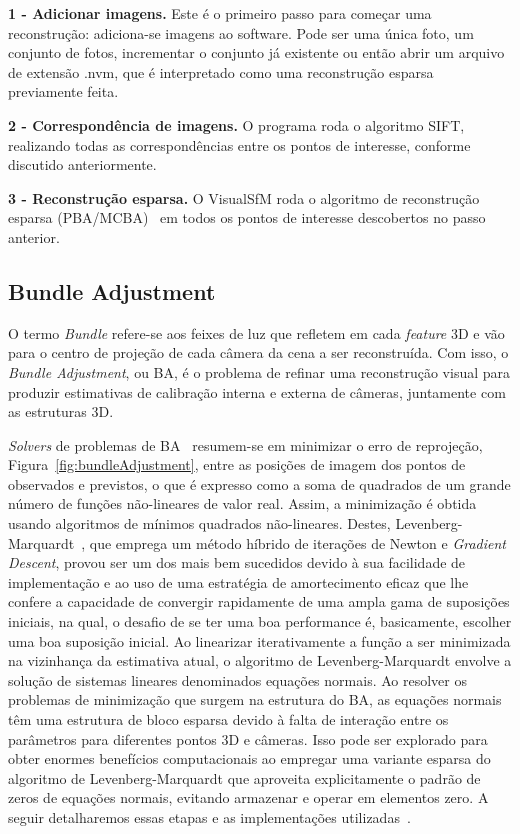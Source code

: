 \noindent \textbf{1 - Adicionar imagens.} Este é o primeiro passo para
  começar uma reconstrução: adiciona-se imagens ao software. Pode ser
  uma única foto, um conjunto de fotos, incrementar o conjunto já existente ou
  então abrir um arquivo de extensão .nvm, que é interpretado como uma
  reconstrução esparsa previamente feita.

\noindent \textbf{2 - Correspondência de imagens.} O programa roda o
  algoritmo SIFT, realizando todas as correspondências entre os pontos de
  interesse, conforme discutido anteriormente.

\noindent \textbf{3 - Reconstrução esparsa.} O VisualSfM roda o
  algoritmo de reconstrução esparsa (PBA/MCBA)~\cite{wu2011multicore} em todos
  os pontos de interesse descobertos no passo anterior. 


\subsection{Bundle Adjustment}

O termo \emph{Bundle} refere-se aos feixes de luz que refletem em cada
\emph{feature} 3D e vão para o centro de projeção de cada câmera da cena a ser reconstruída.
Com isso, o \emph{Bundle Adjustment}, ou BA, é o problema de refinar uma reconstrução
visual para produzir estimativas de calibração interna e externa de câmeras, juntamente com as estruturas 3D.

\emph{Solvers} de problemas de BA~\cite{bundleAdjustmentSlide} resumem-se em
minimizar o erro de reprojeção, Figura~\ref{fig:bundleAdjustment}, entre as posições de
imagem dos pontos de observados e previstos, o que é expresso como a soma
de quadrados de um grande número de funções não-lineares de valor real. Assim, a
minimização é obtida usando algoritmos de mínimos quadrados não-lineares.
Destes, Levenberg-Marquardt~\cite{more1978levenberg,press1992art}, que emprega
um método híbrido de iterações de Newton e \emph{Gradient Descent}, provou ser um
dos mais bem sucedidos devido à sua facilidade de implementação e ao uso de uma
estratégia de amortecimento eficaz que lhe confere a capacidade de convergir
rapidamente de uma ampla gama de suposições iniciais, na qual, o desafio de se
ter uma boa performance é, basicamente, escolher uma boa suposição inicial. Ao
linearizar iterativamente a função a ser minimizada na vizinhança da estimativa
atual, o algoritmo de Levenberg-Marquardt envolve a solução de sistemas lineares
denominados equações normais. Ao resolver os problemas de minimização que surgem
na estrutura do BA, as equações normais têm uma estrutura
de bloco esparsa devido à falta de interação entre os parâmetros para diferentes
pontos 3D e câmeras. Isso pode ser explorado para obter enormes benefícios
computacionais ao empregar uma variante esparsa do algoritmo de
Levenberg-Marquardt que aproveita explicitamente o padrão de zeros de equações
normais, evitando armazenar e operar em elementos zero.  A seguir detalharemos
essas etapas e as implementações utilizadas~\cite{fabbri2011multiview}.

